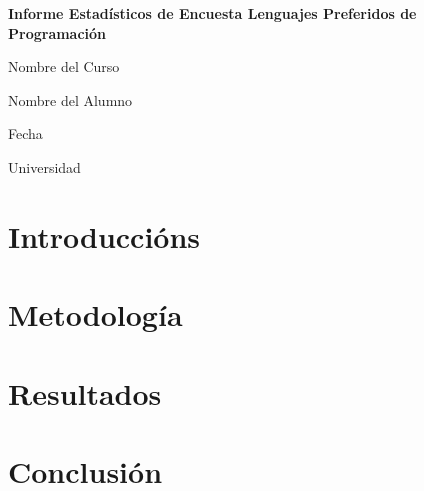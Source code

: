 \documentclass[12pt]{report}
\begin{document}
\begin{titlepage}
    \centering
    {\huge\bfseries Informe Estadísticos de Encuesta Lenguajes Preferidos de Programación \par}
    \vspace{1cm}
    {\Large Nombre del Curso \par}
    \vspace{2cm}
    {\Large Nombre del Alumno \par}
    \vfill
    {\large Fecha \par}
    \vfill
    {\large Universidad \par}
\end{titlepage}

\tableofcontents
\newpage

\chapter{Introduccións}


\chapter{Metodología}


\chapter{Resultados}


\chapter{Conclusión}




\end{document}
